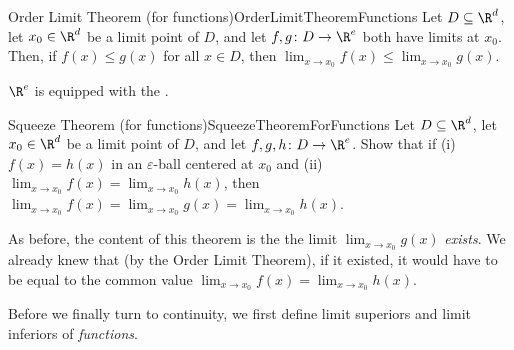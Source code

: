\begin{exr}{Order Limit Theorem (for functions)}{OrderLimitTheoremFunctions}
Let $D\subseteq \R ^d$, let $x_0\in \R ^d$ be a limit point of $D$, and let $f,g\colon D\rightarrow \R ^e$ both have limits at $x_0$.  Then, if $f(x)\leq g(x)$ for all $x\in D$, then $\lim _{x\to x_0}f(x)\leq \lim _{x\to x_0}g(x)$.
\begin{rmk}
$\R ^e$ is equipped with the .
\end{rmk}
\end{exr}
\begin{exr}{Squeeze Theorem (for functions)}{SqueezeTheoremForFunctions}
Let $D\subseteq \R ^d$, let $x_0\in \R ^d$ be a limit point of $D$, and let $f,g,h\colon D\rightarrow \R ^e$.  Show that if (i)~$f(x)=h(x)$ in an $\varepsilon$-ball centered at $x_0$ and (ii)~$\lim _{x\to x_0}f(x)=\lim _{x\to x_0}h(x)$, then $\lim _{x\to x_0}f(x)=\lim _{x\to x_0}g(x)=\lim _{x\to x_0}h(x)$.
\begin{rmk}
As before, the content of this theorem is the the limit $\lim _{x\to x_0}g(x)$ \emph{exists}.  We already knew that (by the Order Limit Theorem), if it existed, it would have to be equal to the common value $\lim _{x\to x_0}f(x)=\lim _{x\to x_0}h(x)$.
\end{rmk}
\end{exr}
Before we finally turn to continuity, we first define limit superiors and limit inferiors of \emph{functions}.
